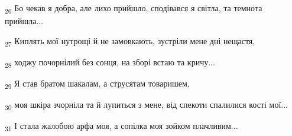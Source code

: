 \begin{tcolorbox}
\textsubscript{26} Бо чекав я добра, але лихо прийшло, сподівався я світла, та темнота прийшла...
\end{tcolorbox}
\begin{tcolorbox}
\textsubscript{27} Киплять мої нутрощі й не замовкають, зустріли мене дні нещастя,
\end{tcolorbox}
\begin{tcolorbox}
\textsubscript{28} ходжу почорнілий без сонця, на зборі встаю та кричу...
\end{tcolorbox}
\begin{tcolorbox}
\textsubscript{29} Я став братом шакалам, а струсятам товаришем,
\end{tcolorbox}
\begin{tcolorbox}
\textsubscript{30} моя шкіра зчорніла та й лупиться з мене, від спекоти спалилися кості мої...
\end{tcolorbox}
\begin{tcolorbox}
\textsubscript{31} І стала жалобою арфа моя, а сопілка моя зойком плачливим...
\end{tcolorbox}
